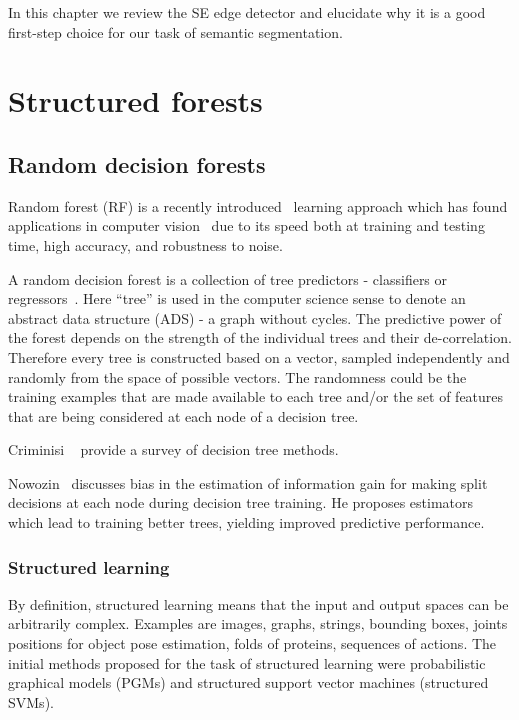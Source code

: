 In this chapter we review the SE edge detector and elucidate why it is a good first-step choice for our task of semantic segmentation.

\section{Structured forests}
\subsection*{Random decision forests}
Random forest (RF) is a recently introduced~\cite{Breiman01} learning approach which has found applications in computer vision~\cite{KontschiederBBP11,LimZD13,DollarICCV13edges,Dollar2015PAMI} due to its speed both at training and testing time, high accuracy, and robustness to noise.

A random decision forest is a collection %
of tree predictors - classifiers or regressors~\cite{breiman1984classification}. Here ``tree'' is used in the computer science sense to denote an abstract data structure (ADS) - a graph without cycles. 
The predictive power of the forest depends on the strength of the individual trees and their de-correlation. Therefore every tree is constructed based on a vector, sampled independently and randomly from the space of possible vectors. The randomness could be \wrt the training examples that are made available to each tree and\slash or the set of features that are being considered at each node of a decision tree.

Criminisi \etal~\cite{Criminisi12} provide a survey of decision tree methods.

Nowozin~\cite{Nowozin12improvedinformation,nowozin2014decision} discusses bias in the estimation of information gain for making split decisions at each node during decision tree training. He proposes estimators which lead to training better trees, yielding improved predictive performance.

\subsubsection*{Structured learning}
By definition, structured learning means that the input and output spaces can be arbitrarily complex. Examples are images, graphs, strings, bounding boxes, joints positions for object pose estimation, folds of proteins, sequences of actions. The initial methods proposed for the task of structured learning were probabilistic graphical models (PGMs) and structured support vector machines (structured SVMs).

